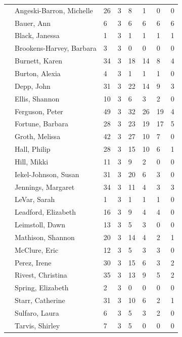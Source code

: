 \documentclass{article}\usepackage[]{graphicx}\usepackage[]{color}
\begin{document}
{\begin{longtable} { >{\raggedright}p{}p{}p{}p{}p{}p{}p{}p{}}
   \rowcolor[gray]{0.90} & Angeski-Barron, Michelle & 26 & 3 & 8 & 1 & 0 & 0 \\ 
   & Bauer, Ann & 6 & 3 & 6 & 6 & 6 & 6 \\ 
   & Black, Janessa & 1 & 3 & 1 & 1 & 1 & 1 \\ 
   & Brookens-Harvey, Barbara & 3 & 3 & 0 & 0 & 0 & 0 \\ 
   \rowcolor[gray]{0.90} & Burnett, Karen & 34 & 3 & 18 & 14 & 8 & 4 \\ 
   \rowcolor[gray]{0.90} & Burton, Alexia & 4 & 3 & 1 & 1 & 1 & 0 \\ 
   \rowcolor[gray]{0.90} & Depp, John & 31 & 3 & 22 & 14 & 9 & 3 \\ 
   & Ellis, Shannon & 10 & 3 & 6 & 3 & 2 & 0 \\ 
   & Ferguson, Peter & 49 & 3 & 32 & 26 & 19 & 4 \\ 
   & Fortune, Barbara & 28 & 3 & 23 & 19 & 17 & 5 \\ 
   \rowcolor[gray]{0.90} & Groth, Melissa & 42 & 3 & 27 & 10 & 7 & 0 \\ 
   \rowcolor[gray]{0.90} & Hall, Philip & 28 & 3 & 15 & 10 & 6 & 1 \\ 
   \rowcolor[gray]{0.90} & Hill, Mikki & 11 & 3 & 9 & 2 & 0 & 0 \\ 
   & Iekel-Johnson, Susan & 31 & 3 & 20 & 6 & 3 & 0 \\ 
   & Jennings, Margaret & 34 & 3 & 11 & 4 & 3 & 3 \\ 
   & LeVar, Sarah & 1 & 3 & 1 & 1 & 1 & 0 \\ 
   \rowcolor[gray]{0.90} & Leadford, Elizabeth & 16 & 3 & 9 & 4 & 4 & 0 \\ 
   \rowcolor[gray]{0.90} & Leimstoll, Dawn & 13 & 3 & 5 & 3 & 0 & 0 \\ 
   \rowcolor[gray]{0.90} & Mathison, Shannon & 20 & 3 & 14 & 4 & 2 & 1 \\ 
   & McClure, Eric & 12 & 3 & 5 & 3 & 3 & 0 \\ 
   & Perez, Irene & 30 & 3 & 15 & 6 & 3 & 2 \\ 
   & Rivest, Christina & 35 & 3 & 13 & 9 & 5 & 2 \\ 
   \rowcolor[gray]{0.90} & Spring, Elizabeth & 2 & 3 & 0 & 0 & 0 & 0 \\ 
   \rowcolor[gray]{0.90} & Starr, Catherine & 31 & 3 & 10 & 6 & 2 & 1 \\ 
   \rowcolor[gray]{0.90} & Sulfaro, Laura & 6 & 3 & 5 & 3 & 2 & 0 \\ 
   & Tarvis, Shirley & 7 & 3 & 5 & 0 & 0 & 0 \\ 

\end{longtable}}
\end{document}
